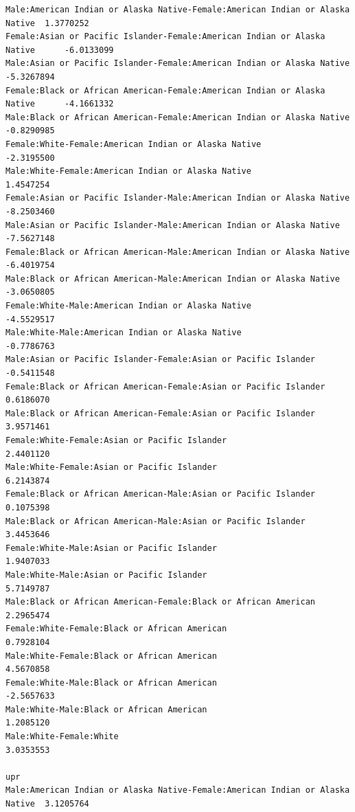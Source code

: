 \documentclass[
  letterpaper,
  DIV=11,
  numbers=noendperiod]{scrartcl}
\begin{document}
\begin{verbatim}
Male:American Indian or Alaska Native-Female:American Indian or Alaska Native  1.3770252
Female:Asian or Pacific Islander-Female:American Indian or Alaska Native      -6.0133099
Male:Asian or Pacific Islander-Female:American Indian or Alaska Native        -5.3267894
Female:Black or African American-Female:American Indian or Alaska Native      -4.1661332
Male:Black or African American-Female:American Indian or Alaska Native        -0.8290985
Female:White-Female:American Indian or Alaska Native                          -2.3195500
Male:White-Female:American Indian or Alaska Native                             1.4547254
Female:Asian or Pacific Islander-Male:American Indian or Alaska Native        -8.2503460
Male:Asian or Pacific Islander-Male:American Indian or Alaska Native          -7.5627148
Female:Black or African American-Male:American Indian or Alaska Native        -6.4019754
Male:Black or African American-Male:American Indian or Alaska Native          -3.0650805
Female:White-Male:American Indian or Alaska Native                            -4.5529517
Male:White-Male:American Indian or Alaska Native                              -0.7786763
Male:Asian or Pacific Islander-Female:Asian or Pacific Islander               -0.5411548
Female:Black or African American-Female:Asian or Pacific Islander              0.6186070
Male:Black or African American-Female:Asian or Pacific Islander                3.9571461
Female:White-Female:Asian or Pacific Islander                                  2.4401120
Male:White-Female:Asian or Pacific Islander                                    6.2143874
Female:Black or African American-Male:Asian or Pacific Islander                0.1075398
Male:Black or African American-Male:Asian or Pacific Islander                  3.4453646
Female:White-Male:Asian or Pacific Islander                                    1.9407033
Male:White-Male:Asian or Pacific Islander                                      5.7149787
Male:Black or African American-Female:Black or African American                2.2965474
Female:White-Female:Black or African American                                  0.7928104
Male:White-Female:Black or African American                                    4.5670858
Female:White-Male:Black or African American                                   -2.5657633
Male:White-Male:Black or African American                                      1.2085120
Male:White-Female:White                                                        3.0353553
                                                                                     upr
Male:American Indian or Alaska Native-Female:American Indian or Alaska Native  3.1205764

\end{verbatim}
\end{document}
